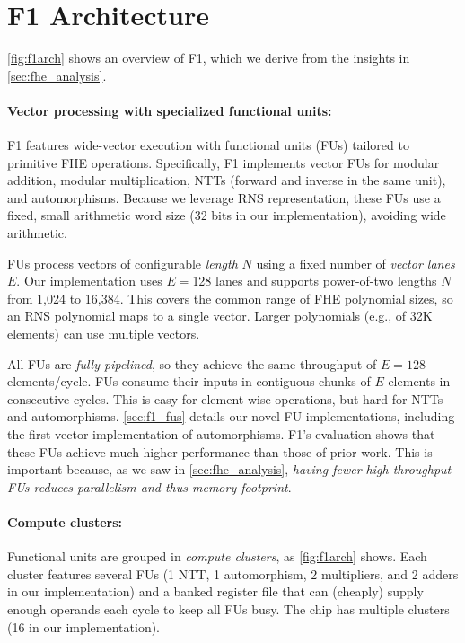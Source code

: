 \section{F1 Architecture}\label{sec:f1_arch}

\autoref{fig:f1arch} shows an overview of F1, which we derive from the insights
in \autoref{sec:fhe_analysis}.

\paragraph{Vector processing with specialized functional units:}
F1 features wide-vector execution with functional units (FUs) tailored to
primitive FHE operations. Specifically, F1 implements vector FUs for modular
addition, modular multiplication, NTTs (forward and inverse in the same unit),
and automorphisms. Because we leverage RNS representation, these FUs use a
fixed, small arithmetic word size (32 bits in our implementation), avoiding
wide arithmetic.

FUs process vectors of configurable \emph{length} $N$ using a fixed number of
\emph{vector lanes} $E$. Our implementation uses $E=$128 lanes and supports
power-of-two lengths $N$ from 1,024 to 16,384. This covers the common range of
FHE polynomial sizes, so an RNS polynomial maps to a single vector. Larger
polynomials (e.g., of 32K elements) can use multiple vectors.

All FUs are \emph{fully pipelined}, so they achieve the same throughput of
$E=128$ elements/cycle. FUs consume their inputs in contiguous chunks of $E$
elements in consecutive cycles. This is easy for element-wise operations, but
hard for NTTs and automorphisms. \autoref{sec:f1_fus} details our novel FU
implementations, including the first vector implementation of automorphisms.
F1's evaluation shows that these FUs achieve much higher performance than those
of prior work. This is important because, as we saw in
\autoref{sec:fhe_analysis}, \emph{having fewer high-throughput FUs reduces
parallelism and thus memory footprint}.

\paragraph{Compute clusters:}
Functional units are grouped in \emph{compute clusters}, as
\autoref{fig:f1arch} shows. Each cluster features several FUs (1 NTT, 1
automorphism, 2 multipliers, and 2 adders in our implementation) and a banked
register file that can (cheaply) supply enough operands each cycle to keep all
FUs busy. The chip has multiple clusters (16 in our implementation).


